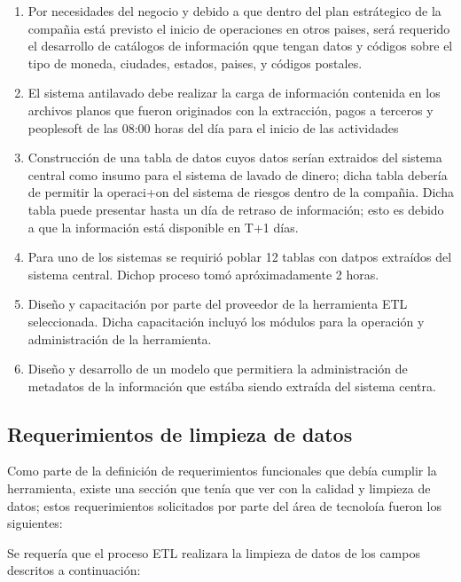 \begin{enumerate}
\item Por necesidades del negocio y debido a que dentro del plan estrátegico de la compañia está previsto el inicio de operaciones en otros paises, será requerido el desarrollo de catálogos de información qque tengan datos y códigos sobre el tipo de moneda, ciudades, estados, paises, y códigos postales.
\item El sistema antilavado debe realizar la carga de información contenida en los archivos planos que fueron originados con la extracción, pagos a terceros y peoplesoft  de las 08:00 horas del día para el inicio de las actividades
\item Construcción de una tabla de datos cuyos datos serían extraidos del sistema central como insumo para el sistema de lavado de dinero; dicha tabla debería de permitir la operaci+on del sistema de riesgos dentro de la compañia. Dicha tabla puede presentar hasta un día de retraso de información; esto es debido a que la información está disponible en T+1 días.
\item Para uno de los sistemas se requirió poblar 12 tablas con datpos extraídos del sistema central. Dichop proceso tomó apróximadamente 2 horas.
\item Diseño y capacitación por parte del proveedor de la herramienta ETL seleccionada. Dicha capacitación incluyó los módulos para la operación y administración de la herramienta.
\item Diseño y desarrollo de un modelo que permitiera la administración de metadatos de la información que estába siendo extraída del sistema centra.
\end{enumerate}

\subsection{Requerimientos de limpieza de datos}

Como parte de la definición de requerimientos funcionales que debía cumplir la
herramienta, existe una sección que tenía que ver con la calidad y limpieza de
datos; estos requerimientos solicitados por parte del área de tecnoloía fueron
los siguientes:

Se requería que el proceso ETL realizara la limpieza de datos de los campos
descritos a continuación:

